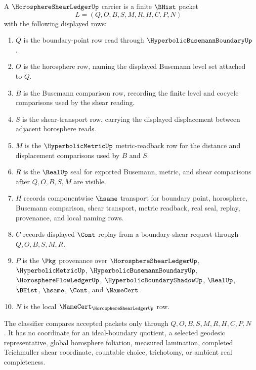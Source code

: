 \begin{definition}
\label{def:horosphere-shear-ledger-carrier}
A $\HorosphereShearLedgerUp$ carrier is a finite $\BHist$ packet
$$
L=(Q,O,B,S,M,R,H,C,P,N)
$$
with the following displayed rows:
\begin{enumerate}
\item $Q$ is the boundary-point row read through $\HyperbolicBusemannBoundaryUp$.
\item $O$ is the horosphere row, naming the displayed Busemann level set attached to $Q$.
\item $B$ is the Busemann comparison row, recording the finite level and cocycle comparisons used by the shear reading.
\item $S$ is the shear-transport row, carrying the displayed displacement between adjacent horosphere reads.
\item $M$ is the $\HyperbolicMetricUp$ metric-readback row for the distance and displacement comparisons used by $B$ and $S$.
\item $R$ is the $\RealUp$ seal for exported Busemann, metric, and shear comparisons after $Q,O,B,S,M$ are visible.
\item $H$ records componentwise $\hsame$ transport for boundary point, horosphere, Busemann comparison, shear transport, metric readback, real seal, replay, provenance, and local naming rows.
\item $C$ records displayed $\Cont$ replay from a boundary-shear request through $Q,O,B,S,M,R$.
\item $P$ is the $\Pkg$ provenance over $\HorosphereShearLedgerUp$, $\HyperbolicMetricUp$, $\HyperbolicBusemannBoundaryUp$, $\HorosphereFlowLedgerUp$, $\HyperbolicBoundaryShadowUp$, $\RealUp$, $\BHist$, $\hsame$, $\Cont$, and $\NameCert$.
\item $N$ is the local $\NameCert_{\HorosphereShearLedgerUp}$ row.
\end{enumerate}
The classifier compares accepted packets only through $Q,O,B,S,M,R,H,C,P,N$. It has no coordinate for an ideal-boundary quotient, a selected geodesic representative, global horosphere foliation, measured lamination, completed Teichmuller shear coordinate, countable choice, trichotomy, or ambient real completeness.
\end{definition}

